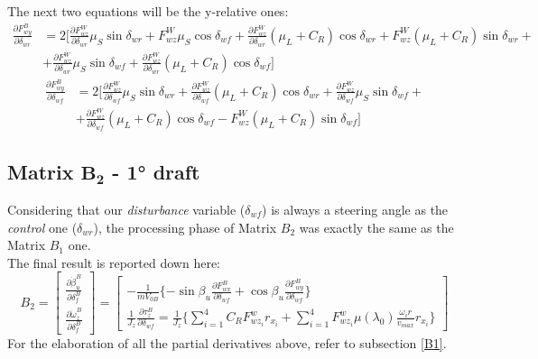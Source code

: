 	The next two equations will be the y-relative ones:
		\begin{equation} \label{Fwy su deltaR}
			\begin{split}
				\frac{\partial F_{wy}^{B}}{\partial \delta_{wr}} &= 2 [\frac{\partial F_{wz}^{W}}{\partial \delta_{wr}} \mu_{S} \sin \delta_{wr} + F_{wz}^{W} \mu_{S}\cos\delta_{wf} + \frac{\partial F_{wz}^{W}}{\partial \delta_{wr}} (\mu_{L}+C_{R}) \cos\delta_{wr} + F_{wz}^{W}(\mu_{L}+C_{R}) \sin\delta_{wr}+ \\ &+ \frac{\partial F_{wz}^{W}}{\partial \delta_{wr}} \mu_{S} \sin \delta_{wf} + \frac{\partial F_{wz}^{W}}{\partial \delta_{wr}} (\mu_{L}+C_{R})\cos\delta_{wf}]
			\end{split}
		\end{equation}
		\begin{equation} \label{Fwy su deltaF}
			\begin{split}
				\frac{\partial F_{wy}^{B}}{\partial \delta_{wf}} &= 2 [\frac{\partial F_{wz}^{W}}{\partial \delta_{wf}} \mu_{S} \sin \delta_{wr} + \frac{\partial F_{wz}^{W}}{\partial \delta_{wf}} (\mu_{L}+C_{R}) \cos\delta_{wr} + \frac{\partial F_{wz}^{W}}{\partial \delta_{wf}} \mu_{S} \sin \delta_{wf}+ \\ &+ \frac{\partial F_{wz}^{W}}{\partial \delta_{wf}} (\mu_{L}+C_{R})\cos\delta_{wf} - F_{wz}^{W} (\mu_{L}+C_{R}) \sin\delta_{wf}]
			\end{split}
		\end{equation}
\subsection{Matrix $\mathbf{B_{2}}$ - 1° draft}
	Considering that our \textit{disturbance} variable ($\delta_{wf}$) is always a steering angle as the \textit{control} one ($\delta_{wr}$), the processing phase of Matrix $B_{2}$ was exactly the same as the Matrix $B_{1}$ one. \\ The final result is reported down here:
		\begin{equation}
			B_{2}=
			\begin{bmatrix}
				\frac{\partial\dot{\beta}_{u}^{B}}{\partial\delta_{f}^{B}} \\
				\frac{\partial\dot{\omega}_{z}^{B}}{\partial\delta_{f}^{B}} 
			\end{bmatrix} =
			\begin{bmatrix}
				-\frac{1}{mV_{0B}}\{-\sin\beta_{u}\frac{\partial F_{wx}^{B}}{\partial \delta_{wf}} + \cos\beta_{u}\frac{\partial F_{wy}^{B}}{\partial \delta_{wf}}\} \\
				\frac{1}{J_{z}} \frac{\partial \tau_{z}^{B}}{\partial\delta_{wf}} = \frac{1}{J_{z}} \{ \sum\limits_{i=1}^4 C_{R}F_{wz_{i}}^{w} r_{x_{i}} + \sum\limits_{i=1}^4 F_{wz_{i}}^{w} \mu(\lambda_{0}) \frac{\omega_{i} r}{v_{max}}r_{x_{i}} \}
			\end{bmatrix}
		\end{equation}
	For the elaboration of all the partial derivatives above, refer to subsection \ref{B1}.
